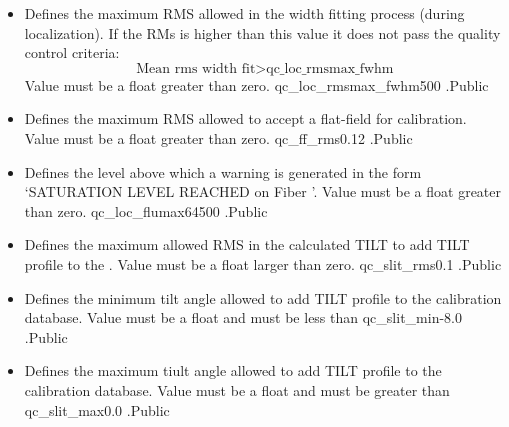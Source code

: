 \begin{itemize}
\item {} 
{Defines the maximum RMS allowed in the width fitting process (during localization). If the RMs is higher than this value it does not pass the quality control criteria: 
\begin{equation}
\text{Mean rms width fit} > \text{qc\_loc\_rmsmax\_fwhm}
\end{equation}
Value must be a float greater than zero.
}
{qc\_loc\_rmsmax\_fwhm}{500}
{\callocRAW}{\constantsfile}{\callocRAW.\progMAIN}{Public}

\item {}
{Defines the maximum RMS allowed to accept a flat-field for calibration. Value must be a float greater than zero.}
{qc\_ff\_rms}{0.12}
{\calFFraw}{\constantsfile}{\calFFraw.\progMAIN}{Public}

\item {}
{Defines the level above which a warning is generated in the form `SATURATION LEVEL REACHED on Fiber '. Value must be a float greater than zero.}
{qc\_loc\_flumax}{64500}
{\calFFraw}{\constantsfile}{\calFFraw.\progMAIN}{Public}

\item {} 
{Defines the maximum allowed RMS in the calculated TILT to add TILT profile to the \calibdb. Value must be a float larger than zero.}
{qc\_slit\_rms}{0.1}
{\calSLIT}{\constantsfile}{\calSLIT.\progMAIN}{Public}

\item {} 
{Defines the minimum tilt angle allowed to add TILT profile to the calibration database. Value must be a float and must be less than }
{qc\_slit\_min}{-8.0}
{\calSLIT}{\constantsfile}{\calSLIT.\progMAIN}{Public}

\item {} 
{Defines the maximum tiult angle allowed to add TILT profile to the calibration database. Value must be a float and must be greater than }
{qc\_slit\_max}{0.0}
{\calSLIT}{\constantsfile}{\calSLIT.\progMAIN}{Public}


\end{itemize}
